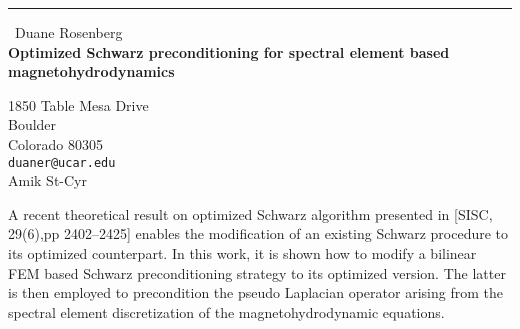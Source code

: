 \documentclass{report}
\begin{document}
\begin{center}
\rule{6in}{1pt} \
{\large Duane Rosenberg \\
{\bf Optimized Schwarz preconditioning for spectral element based magnetohydrodynamics }}

1850 Table Mesa Drive \\ Boulder \\ Colorado 80305
\\
{\tt duaner@ucar.edu}\\
Amik St-Cyr\end{center}

A recent theoretical result on optimized Schwarz algorithm presented
in [SISC, 29(6),pp 2402--2425] enables the modification of an existing
Schwarz procedure to its optimized counterpart. In this work, it is
shown how to modify a bilinear FEM based Schwarz preconditioning strategy
to its optimized version. The latter is then employed to precondition the
pseudo Laplacian operator arising from the spectral element discretization
of the magnetohydrodynamic equations.
\end{document}
